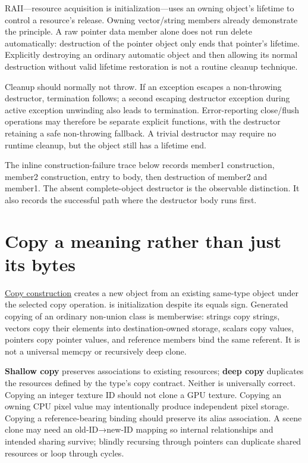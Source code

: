 RAII---resource acquisition is initialization---uses an owning object's lifetime to control a resource's release. Owning vector/string members already demonstrate the principle. A raw pointer data member alone does not run delete automatically: destruction of the pointer object only ends that pointer's lifetime. Explicitly destroying an ordinary automatic object and then allowing its normal destruction without valid lifetime restoration is not a routine cleanup technique.

Cleanup should normally not throw. If an exception escapes a non-throwing destructor, termination follows; a second escaping destructor exception during active exception unwinding also leads to termination. Error-reporting close/flush operations may therefore be separate explicit functions, with the destructor retaining a safe non-throwing fallback. A trivial destructor may require no runtime cleanup, but the object still has a lifetime end.

The inline construction-failure trace below records member1 construction, member2 construction, entry to body, then destruction of member2 and member1. The absent complete-object destructor is the observable distinction. It also records the successful path where the destructor body runs first.

\section{Copy a meaning rather than just its bytes}\label{01-foundations-i-ch003-copy-a-meaning-rather-than-just-its-bytes}

\hypertarget{01-foundations-i-ch003-copy-a-meaning-rather-than-just-its-bytes}{}

\hyperref[appendix-1340cd1ce582]{Copy construction} creates a new object from an existing same-type object under the selected copy operation.  is initialization despite its equals sign. Generated copying of an ordinary non-union class is memberwise: strings copy strings, vectors copy their elements into destination-owned storage, scalars copy values, pointers copy pointer values, and reference members bind the same referent. It is not a universal memcpy or recursively deep clone.

\textbf{Shallow copy} preserves associations to existing resources; \textbf{deep copy} duplicates the resources defined by the type's copy contract. Neither is universally correct. Copying an integer texture ID should not clone a GPU texture. Copying an owning CPU pixel value may intentionally produce independent pixel storage. Copying a reference-bearing binding should preserve its alias association. A scene clone may need an old-ID→new-ID mapping so internal relationships and intended sharing survive; blindly recursing through pointers can duplicate shared resources or loop through cycles.

